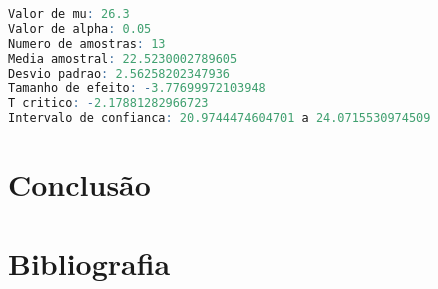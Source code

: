 \documentclass[12pt, a4paper]{article}
\begin{document}
\begin{lstlisting}[language=R]
Valor de mu: 26.3
Valor de alpha: 0.05
Numero de amostras: 13
Media amostral: 22.5230002789605
Desvio padrao: 2.56258202347936
Tamanho de efeito: -3.77699972103948
T critico: -2.17881282966723
Intervalo de confianca: 20.9744474604701 a 24.0715530974509
\end{lstlisting}

\section{Conclusão}

\section{Bibliografia}
		
\end{document}

